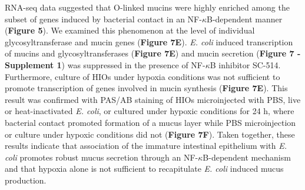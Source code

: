 \documentclass[9pt,lineo]{elife}
\begin{document}
RNA-seq data suggested that O-linked mucins were highly enriched among the subset of genes induced by bacterial contact in an NF-\(\kappa\)B-dependent manner (\textbf{Figure 5}). We examined this phenomenon at the level of individual glycosyltransferase and mucin genes (\textbf{Figure 7E}). \emph{E. coli} induced transcription of mucins and glycosyltransferases (\textbf{Figure 7E}) and mucin secretion (\textbf{Figure 7 - Supplement 1})  was suppressed in the presence of NF-\(\kappa\)B inhibitor SC-514. Furthermore, culture of HIOs under hypoxia conditions was not sufficient to promote transcription of genes involved in mucin synthesis (\textbf{Figure 7E}). This result was confirmed with PAS/AB staining of HIOs microinjected with PBS, live or heat-inactivated \emph{E. coli}, or cultured under hypoxic conditions for 24 h, where bacterial contact promoted formation of a mucus layer while PBS microinjection or culture under hypoxic conditions did not (\textbf{Figure 7F}). Taken together, these results indicate that association of the immature intestinal epithelium with \emph{E. coli} promotes robust mucus secretion through an NF-\(\kappa\)B-dependent mechanism and that hypoxia alone is not sufficient to recapitulate \emph{E. coli} induced mucus production.
\end{document}
